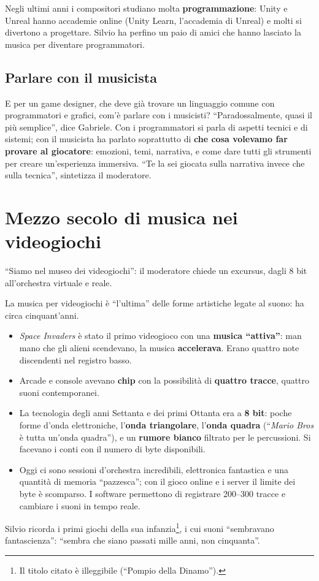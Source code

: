 Negli ultimi anni i compositori studiano molta \textbf{programmazione}: Unity e
Unreal hanno accademie online (Unity Learn, l'accademia di Unreal) e molti si
divertono a progettare. Silvio ha perfino un paio di amici che hanno lasciato la
musica per diventare programmatori.

\subsection{Parlare con il musicista}

E per un game designer, che deve già trovare un linguaggio comune con
programmatori e grafici, com'è parlare con i musicisti? ``Paradossalmente, quasi
il più semplice'', dice Gabriele. Con i programmatori si parla di aspetti
tecnici e di sistemi; con il musicista ha parlato soprattutto di \textbf{che
cosa volevamo far provare al giocatore}: emozioni, temi, narrativa, e come dare
tutti gli strumenti per creare un'esperienza immersiva. ``Te la sei giocata sulla
narrativa invece che sulla tecnica'', sintetizza il moderatore.

\section{Mezzo secolo di musica nei videogiochi}
\label{sec:c1-5-storia}

``Siamo nel museo dei videogiochi'': il moderatore chiede un excursus, dagli 8 bit
all'orchestra virtuale e reale.

La musica per videogiochi è ``l'ultima'' delle forme artistiche legate al suono:
ha circa cinquant'anni.
\begin{itemize}
  \item \emph{Space Invaders} è stato il primo videogioco con una \textbf{musica
        ``attiva''}: man mano che gli alieni scendevano, la musica
        \textbf{accelerava}. Erano quattro note discendenti nel registro basso.
  \item Arcade e console avevano \textbf{chip} con la possibilità di \textbf{quattro
        tracce}, quattro suoni contemporanei.
  \item La tecnologia degli anni Settanta e dei primi Ottanta era a
        \textbf{8 bit}: poche forme d'onda elettroniche, l'\textbf{onda
        triangolare}, l'\textbf{onda quadra} (``\emph{Mario Bros} è tutta un'onda
        quadra''), e un \textbf{rumore bianco} filtrato per le percussioni. Si
        facevano i conti con il numero di byte disponibili.
  \item Oggi ci sono sessioni d'orchestra incredibili, elettronica fantastica e
        una quantità di memoria ``pazzesca''; con il gioco online e i server il
        limite dei byte è scomparso. I software permettono di registrare 200--300
        tracce e cambiare i suoni in tempo reale.
\end{itemize}
Silvio ricorda i primi giochi della sua infanzia\footnote{Il titolo citato è
illeggibile (``Pompio della Dinamo'').}, i cui suoni ``sembravano fantascienza'':
``sembra che siano passati mille anni, non cinquanta''.

